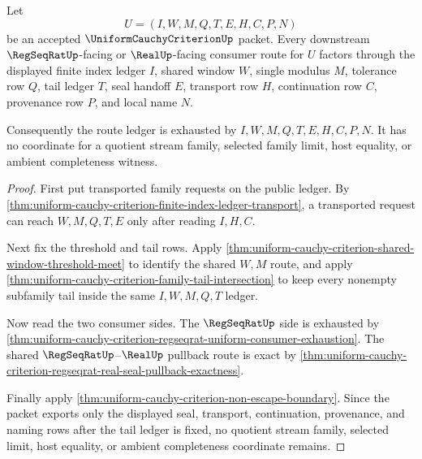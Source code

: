 \begin{theorem}
\label{thm:uniform-cauchy-criterion-finite-ledger-route-coverage}
Let
$$
U=(I,W,M,Q,T,E,H,C,P,N)
$$
be an accepted $\UniformCauchyCriterionUp$ packet. Every downstream $\RegSeqRatUp$-facing or $\RealUp$-facing consumer route for $U$ factors through the displayed finite index ledger $I$, shared window $W$, single modulus $M$, tolerance row $Q$, tail ledger $T$, seal handoff $E$, transport row $H$, continuation row $C$, provenance row $P$, and local name $N$.

Consequently the route ledger is exhausted by $I,W,M,Q,T,E,H,C,P,N$. It has no coordinate for a quotient stream family, selected family limit, host equality, or ambient completeness witness.
\end{theorem}
\begin{proof}
First put transported family requests on the public ledger. By \autoref{thm:uniform-cauchy-criterion-finite-index-ledger-transport}, a transported request can reach $W,M,Q,T,E$ only after reading $I,H,C$.

Next fix the threshold and tail rows. Apply \autoref{thm:uniform-cauchy-criterion-shared-window-threshold-meet} to identify the shared $W,M$ route, and apply \autoref{thm:uniform-cauchy-criterion-family-tail-intersection} to keep every nonempty subfamily tail inside the same $I,W,M,Q,T$ ledger.

Now read the two consumer sides. The $\RegSeqRatUp$ side is exhausted by \autoref{thm:uniform-cauchy-criterion-regseqrat-uniform-consumer-exhaustion}. The shared $\RegSeqRatUp$--$\RealUp$ pullback route is exact by \autoref{thm:uniform-cauchy-criterion-regseqrat-real-seal-pullback-exactness}.

Finally apply \autoref{thm:uniform-cauchy-criterion-non-escape-boundary}. Since the packet exports only the displayed seal, transport, continuation, provenance, and naming rows after the tail ledger is fixed, no quotient stream family, selected limit, host equality, or ambient completeness coordinate remains.
\end{proof}

